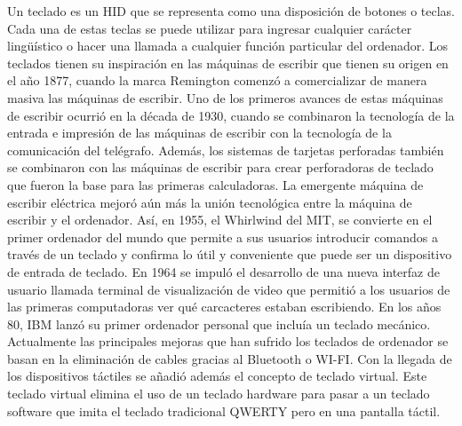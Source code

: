 Un teclado es un HID que se representa como una disposici\'on de botones o teclas. Cada una de estas teclas se puede utilizar para ingresar cualquier car\'acter ling\"u\'istico o hacer una llamada a cualquier funci\'on particular del ordenador. Los teclados  tienen su inspiraci\'on en las m\'aquinas de escribir que tienen su origen en el a\~no 1877, cuando la marca Remington comenz\'o a comercializar de manera masiva las m\'aquinas de escribir. Uno de los primeros avances de estas m\'aquinas de escribir ocurri\'o en la d\'ecada de 1930, cuando se combinaron la tecnolog\'ia de la entrada e impresi\'on de las m\'aquinas de escribir con la tecnolog\'ia de la comunicaci\'on del tel\'egrafo. Adem\'as, los sistemas de tarjetas perforadas tambi\'en se combinaron con las m\'aquinas de escribir para crear perforadoras de teclado que fueron la base para las primeras calculadoras. La emergente m\'aquina de escribir el\'ectrica mejor\'o a\'un m\'as la uni\'on tecnol\'ogica entre la m\'aquina de escribir y el ordenador. As\'i, en 1955, el Whirlwind del MIT, se convierte en el primer ordenador del mundo que permite a sus usuarios introducir comandos a trav\'es de un teclado y confirma lo \'util y conveniente que puede ser un dispositivo de entrada de teclado. En 1964 se impul\'o el desarrollo de una nueva interfaz de usuario llamada terminal de visualizaci\'on de video que permiti\'o a los usuarios de las primeras computadoras ver qu\'e carcacteres estaban escribiendo. En los a\~nos 80, IBM lanz\'o su primer ordenador personal que inclu\'ia un teclado mec\'anico. Actualmente las principales mejoras que han sufrido los teclados de ordenador se basan en la eliminaci\'on de cables gracias al Bluetooth o WI-FI. Con la llegada de los dispositivos t\'actiles se a\~nadi\'o adem\'as el concepto de teclado virtual. Este teclado virtual elimina el uso de un teclado hardware para pasar a un teclado software que imita el teclado tradicional QWERTY pero en una pantalla t\'actil. \par


